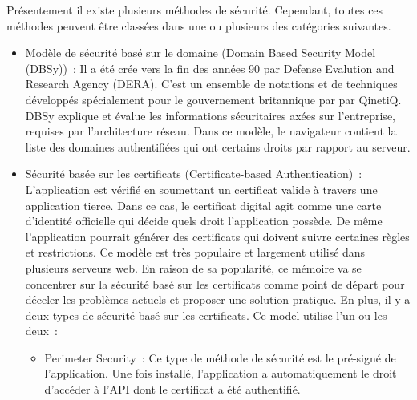  Présentement il existe plusieurs méthodes de sécurité. Cependant, toutes ces méthodes peuvent être classées dans une ou plusieurs des catégories suivantes.
 \begin{itemize}
 \item Modèle de sécurité basé sur le domaine (Domain Based Security Model (DBSy)) : Il a été crée vers la fin des années 90 par Defense Evalution and Research Agency (DERA). C'est un ensemble de notations et de techniques développés spécialement pour le gouvernement britannique par par QinetiQ. DBSy explique et évalue les informations sécuritaires axées sur l'entreprise, requises par l'architecture réseau. Dans ce modèle, le navigateur contient la liste des domaines authentifiées qui ont certains droits par rapport au serveur. 
 \item Sécurité basée sur les certificats (Certificate-based Authentication) : L'application est vérifié en soumettant un certificat valide à travers une application tierce. Dans ce cas, le certificat digital agit comme une carte d'identité officielle qui décide quels droit l'application possède. De même l'application pourrait générer des certificats qui doivent suivre certaines règles et restrictions. Ce modèle est très populaire et largement utilisé dans plusieurs serveurs web. En raison de sa popularité, ce mémoire va se  concentrer sur la sécurité basé sur les certificats comme point de départ pour déceler les problèmes actuels et proposer une solution pratique. En plus, il y a deux types de sécurité basé sur les certificats. Ce model utilise l'un ou les deux :
 \begin{itemize}
 \item Perimeter Security : Ce type de méthode de sécurité est le pré-signé de l'application. Une fois installé, l'application a automatiquement le droit d'accéder à  l'API dont le certificat a été authentifié.
 

\end{itemize}
\end{itemize}
